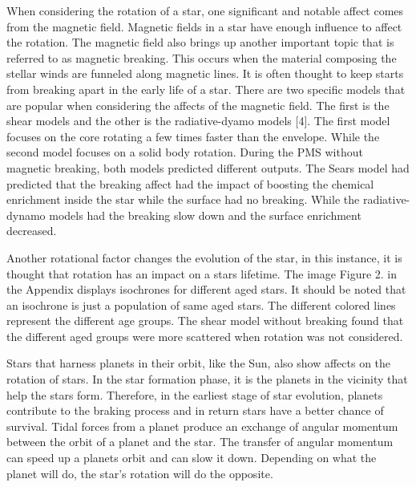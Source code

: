 \documentclass[a4paper, 12pt]{article}
\begin{document}
When considering the rotation of a star, one significant and notable affect comes from the magnetic field. Magnetic fields in a star have enough influence to affect the rotation. The magnetic field also brings up another important topic that is referred to as magnetic breaking. This occurs when the material composing the stellar winds are funneled along magnetic lines. It is often thought to keep starts from breaking apart in the early life of a star. There are two specific models that are popular when considering the affects of the magnetic field. The first is the shear models and the other is the radiative-dyamo models [4]. The first model focuses on the core rotating a few times faster than the envelope. While the second model focuses on a solid body rotation. During the PMS without magnetic breaking, both models predicted different outputs. The Sears model had predicted that the breaking affect had the impact of boosting  the chemical enrichment inside the star while the surface had no breaking. While the radiative-dynamo models had the breaking slow down and the surface enrichment decreased. 

Another rotational factor changes the evolution of the star, in this instance, it is thought that rotation has an impact on a stars lifetime. The image Figure 2. in the Appendix displays isochrones for different aged stars. It should be noted that an isochrone is just a population of same aged stars. The different colored lines represent the different age groups. The shear model without breaking found that the different aged groups were more scattered when rotation was not considered.

Stars that harness planets in their orbit, like the Sun, also show affects on the rotation of stars. In the star formation phase, it is the planets in the vicinity that help the stars form. Therefore, in the earliest stage of star evolution, planets contribute to the braking process and in return stars have a better chance of survival. Tidal forces from a planet produce an exchange of angular momentum between the orbit of a planet and the star. The transfer of angular momentum can speed up a planets orbit and can slow it down. Depending on what the planet will do, the star's rotation will do the opposite. 
\end{document}
